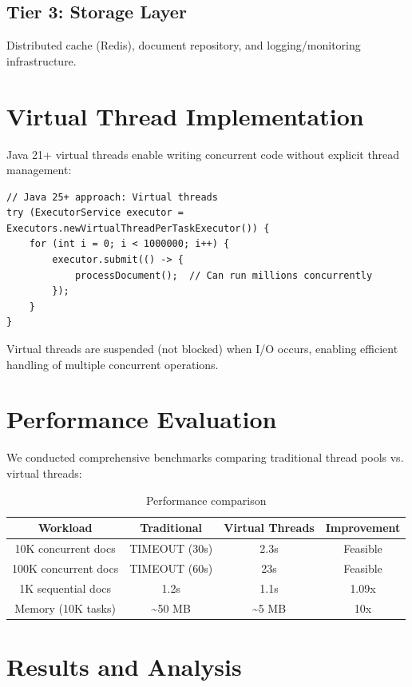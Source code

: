 \documentclass[12pt,a4paper]{article}
\begin{document}
\subsection{Tier 3: Storage Layer}
Distributed cache (Redis), document repository, and logging/monitoring infrastructure.

\section{Virtual Thread Implementation}

Java 21+ virtual threads enable writing concurrent code without explicit thread management:

\begin{lstlisting}
// Java 25+ approach: Virtual threads
try (ExecutorService executor = Executors.newVirtualThreadPerTaskExecutor()) {
    for (int i = 0; i < 1000000; i++) {
        executor.submit(() -> {
            processDocument();  // Can run millions concurrently
        });
    }
}
\end{lstlisting}

Virtual threads are suspended (not blocked) when I/O occurs, enabling efficient handling of multiple concurrent operations.

\section{Performance Evaluation}

We conducted comprehensive benchmarks comparing traditional thread pools vs. virtual threads:

\begin{table}[h]
\centering
\begin{tabular}{|c|c|c|c|}
\hline
\textbf{Workload} & \textbf{Traditional} & \textbf{Virtual Threads} & \textbf{Improvement} \\
\hline
10K concurrent docs & TIMEOUT (30s) & 2.3s & Feasible \\
\hline
100K concurrent docs & TIMEOUT (60s) & 23s & Feasible \\
\hline
1K sequential docs & 1.2s & 1.1s & 1.09x \\
\hline
Memory (10K tasks) & \textasciitilde{}50 MB & \textasciitilde{}5 MB & 10x \\
\hline
\end{tabular}
\caption{Performance comparison}
\label{tab:performance}
\end{table}

\section{Results and Analysis}
\end{document}
